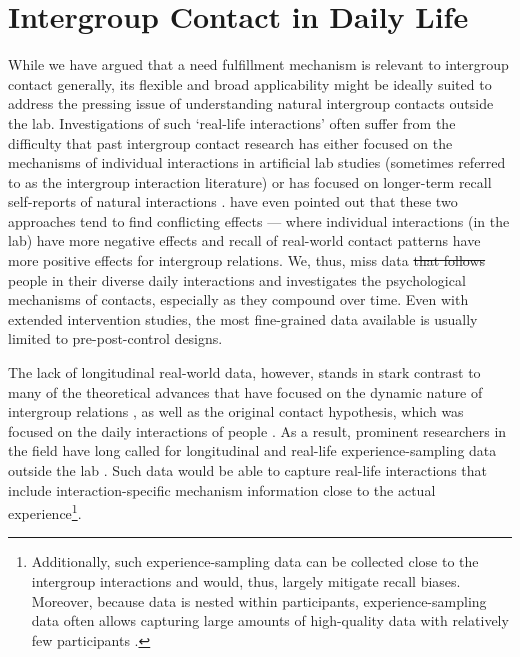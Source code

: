 \documentclass[man, 12pt, a4paper, mask]{apa7}
\theoremstyle{break}
\theoremstyle{plain}
\providecommand{\DIFaddtex}[1]{{\protect\color{blue}\uwave{#1}}} %
\providecommand{\DIFdeltex}[1]{{\protect\color{red}\sout{#1}}}                      %
\providecommand{\DIFaddbegin}{} %
\providecommand{\DIFaddend}{} %
\providecommand{\DIFdelbegin}{} %
\providecommand{\DIFdelend}{} %
\providecommand{\DIFadd}[1]{\texorpdfstring{\DIFaddtex{#1}}{#1}} %
\providecommand{\DIFdel}[1]{\texorpdfstring{\DIFdeltex{#1}}{}} %
\newcommand{\DIFscaledelfig}{0.5}
\newlength{\DIFdelgraphicswidth} %
\newlength{\DIFdelgraphicsheight} %
\newcommand{\DIFaddincludegraphics}[2][]{{\color{blue}\fbox{\DIFOincludegraphics[#1]{#2}}}} %
\newcommand{\DIFdelincludegraphics}[2][]{%
\sbox{\DIFdelgraphicsbox}{\DIFOincludegraphics[#1]{#2}}%
\settoboxwidth{\DIFdelgraphicswidth}{\DIFdelgraphicsbox} %
\settoboxtotalheight{\DIFdelgraphicsheight}{\DIFdelgraphicsbox} %
\scalebox{\DIFscaledelfig}{%
\parbox[b]{\DIFdelgraphicswidth}{\usebox{\DIFdelgraphicsbox}\\[-\baselineskip] \rule{\DIFdelgraphicswidth}{0em}}\llap{\resizebox{\DIFdelgraphicswidth}{\DIFdelgraphicsheight}{%
\setlength{\unitlength}{\DIFdelgraphicswidth}%
\begin{picture}(1,1)%
\thicklines\linethickness{2pt} %
{\color[rgb]{1,0,0}\put(0,0){\framebox(1,1){}}}%
{\color[rgb]{1,0,0}\put(0,0){\line( 1,1){1}}}%
{\color[rgb]{1,0,0}\put(0,1){\line(1,-1){1}}}%
\end{picture}%
}\hspace*{3pt}}} %
} %
\DeclareRobustCommand{\DIFaddbegin}{\DIFOaddbegin \let\includegraphics\DIFaddincludegraphics} %
\DeclareRobustCommand{\DIFaddend}{\DIFOaddend \let\includegraphics\DIFOincludegraphics} %
\DeclareRobustCommand{\DIFdelbegin}{\DIFOdelbegin \let\includegraphics\DIFdelincludegraphics} %
\DeclareRobustCommand{\DIFdelend}{\DIFOaddend \let\includegraphics\DIFOincludegraphics} %
\begin{document}
\section{Intergroup Contact in Daily Life}
While we have argued that a need fulfillment mechanism is relevant to intergroup contact generally, its flexible and broad applicability might be ideally suited to address the pressing issue of understanding natural intergroup contacts outside the lab. Investigations of such `real-life interactions' often suffer from the difficulty that past intergroup contact research has either focused on the mechanisms of individual interactions in artificial lab studies (sometimes referred to as the intergroup interaction literature) or has focused on longer-term recall self-reports of natural interactions \citep[commonly referred to as the intergroup contact literature; also see][]{Pettigrew2006}. \citet[][]{MacInnis2015} have even pointed out that these two approaches tend to find conflicting effects --- where individual interactions (in the lab) have more negative effects and recall of real-world contact patterns have more positive effects for intergroup relations. We, thus, miss data \DIFdelbegin \DIFdel{that follows }\DIFdelend \DIFaddbegin \DIFadd{following }\DIFaddend people in their diverse daily interactions and investigates the psychological mechanisms of contacts, especially as they compound over time. Even with extended intervention studies, the most fine-grained data available is usually limited to pre-post-control designs. 

The lack of longitudinal real-world data, however, stands in stark contrast to many of the theoretical advances that have focused on the dynamic nature of intergroup relations \citep[e.g.,][]{Pettigrew1998}, as well as the original contact hypothesis, which was focused on the daily interactions of people \citep[][]{Allport1954b}. As a result, prominent researchers in the field have long called for longitudinal \citep[][]{Pettigrew1998, Pettigrew2008, Pettigrew2011} and real-life experience-sampling data outside the lab \citep[][]{MacInnis2015, McKeown2017}. Such data would be able to capture real-life interactions that include interaction-specific mechanism information close to the actual experience\footnote{Additionally, such experience-sampling data can be collected close to the intergroup interactions and would, thus, largely mitigate recall biases. Moreover, because data is nested within participants, experience-sampling data often allows capturing large amounts of high-quality data with relatively few participants \citep[][]{shiffman2008}.}.
\end{document}
